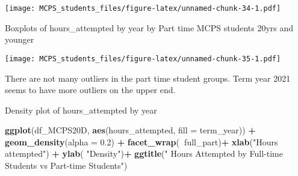 \documentclass[]{article}
\newenvironment{Shaded}{\begin{snugshade}}{\end{snugshade}}
\newcommand{\DataTypeTok}[1]{\textcolor[rgb]{0.13,0.29,0.53}{#1}}
\newcommand{\FloatTok}[1]{\textcolor[rgb]{0.00,0.00,0.81}{#1}}
\newcommand{\KeywordTok}[1]{\textcolor[rgb]{0.13,0.29,0.53}{\textbf{#1}}}
\newcommand{\NormalTok}[1]{#1}
\newcommand{\OperatorTok}[1]{\textcolor[rgb]{0.81,0.36,0.00}{\textbf{#1}}}
\newcommand{\StringTok}[1]{\textcolor[rgb]{0.31,0.60,0.02}{#1}}
\begin{document}
\texttt{[image: MCPS\_students\_files/figure-latex/unnamed-chunk-34-1.pdf]}

Boxplots of hours\_attempted by year by Part time MCPS students 20yrs
and younger

\begin{Shaded}
\end{Shaded}

\texttt{[image: MCPS\_students\_files/figure-latex/unnamed-chunk-35-1.pdf]}

There are not many outliers in the part time student groups. Term year
2021 seems to have more outliers on the upper end.

Density plot of hours\_attempted by year

\begin{Shaded}
\begin{Highlighting}[]
\KeywordTok{ggplot}\NormalTok{(df_MCPS20D, }\KeywordTok{aes}\NormalTok{(hours_attempted, }\DataTypeTok{fill =}\NormalTok{ term_year)) }\OperatorTok{+}\StringTok{ }\KeywordTok{geom_density}\NormalTok{(}\DataTypeTok{alpha =} \FloatTok{0.2}\NormalTok{) }\OperatorTok{+}
\StringTok{  }\KeywordTok{facet_wrap}\NormalTok{(}\OperatorTok{~}\NormalTok{full_part)}\OperatorTok{+}
\StringTok{  }\KeywordTok{xlab}\NormalTok{(}\StringTok{"Hours attempted"}\NormalTok{) }\OperatorTok{+}
\StringTok{  }\KeywordTok{ylab}\NormalTok{( }\StringTok{"Density"}\NormalTok{)}\OperatorTok{+}
\StringTok{   }\KeywordTok{ggtitle}\NormalTok{(}\StringTok{" Hours Attempted by Full-time Students vs Part-time Students"}\NormalTok{)}
\end{Highlighting}
\end{Shaded}
\end{document}
